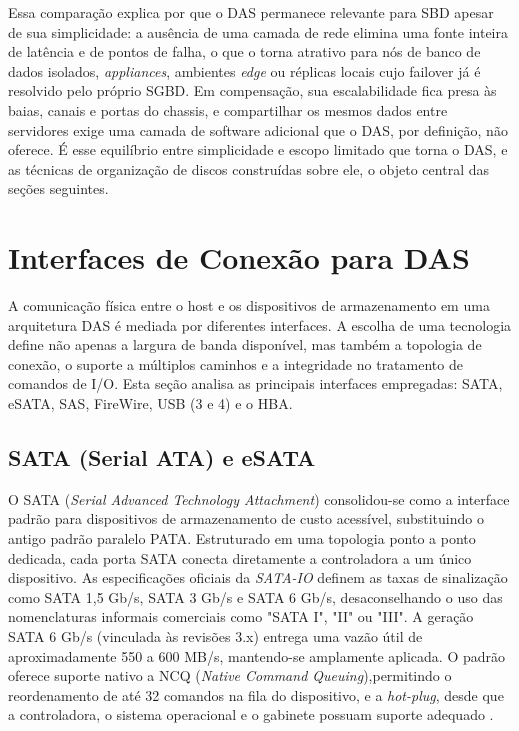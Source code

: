 \documentclass[11pt,a4paper]{article}
\begin{document}
Essa comparação explica por que o DAS permanece relevante para SBD apesar de sua simplicidade: a
ausência de uma camada de rede elimina uma fonte inteira de latência e de pontos de falha, o que o
torna atrativo para nós de banco de dados isolados, \emph{appliances}, ambientes \emph{edge} ou
réplicas locais cujo failover já é resolvido pelo próprio SGBD. Em compensação, sua escalabilidade
fica presa às baias, canais e portas do chassis, e compartilhar os mesmos dados entre servidores
exige uma camada de software adicional que o DAS, por definição, não oferece. É esse equilíbrio entre
simplicidade e escopo limitado que torna o DAS, e as técnicas de organização de discos construídas
sobre ele, o objeto central das seções seguintes.

\section{Interfaces de Conexão para DAS}

A comunicação física entre o host e os dispositivos de armazenamento em uma arquitetura DAS é mediada por diferentes interfaces. A escolha de uma tecnologia define não apenas a largura de banda disponível, mas também a topologia de conexão, o suporte a múltiplos caminhos e a integridade no tratamento de comandos de I/O. Esta seção analisa as principais interfaces empregadas: SATA, eSATA, SAS, FireWire, USB (3 e 4) e o HBA.

\subsection{SATA (Serial ATA) e eSATA}

O SATA (\emph{Serial Advanced Technology Attachment}) consolidou-se como a interface padrão para dispositivos de armazenamento de custo acessível, substituindo o antigo padrão paralelo PATA. Estruturado em uma topologia ponto a ponto dedicada, cada porta SATA conecta diretamente a controladora a um único dispositivo. As especificações oficiais da \emph{SATA-IO} definem as taxas de sinalização como SATA 1,5 Gb/s, SATA 3 Gb/s e SATA 6 Gb/s, desaconselhando o uso das nomenclaturas informais comerciais como "SATA I", "II" ou "III". A geração SATA 6 Gb/s (vinculada às revisões 3.x) entrega uma vazão útil de aproximadamente 550 a 600 MB/s, mantendo-se amplamente aplicada. O padrão oferece suporte nativo a NCQ (\emph{Native Command Queuing}),permitindo o reordenamento de até 32 comandos na fila do dispositivo, e a \emph{hot-plug}, desde que a controladora, o sistema operacional e o gabinete possuam suporte adequado \cite{sataio}.
\end{document}
